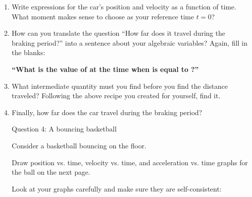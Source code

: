 \documentclass[12pt]{article}
\begin{document}
\begin{enumerate}
\item Write expressions for the car's position and velocity as a function of time. What moment makes sense to choose as your reference time $t=0$?

\vspace{1in}


\item How can you translate the question ``How far does it travel during the braking period?'' into a sentence about your algebraic variables? Again, fill in the blanks: 

\begin{center}
{\bf ``What is the value of \underline{\hspace{0.7in}} at the time when \underline{\hspace{0.7in}} is equal to \underline{\hspace{0.7in}}?''} 
\end{center}


\item What intermediate quantity must you find before you find the distance traveled? Following the above recipe you created for yourself, find it.




\vspace{2in}





\item Finally, how far does the car travel during the braking period?

\newpage

\centerline{\Large Question 4: A bouncing basketball}

Consider a basketball bouncing on the floor.

Draw position vs. time, velocity vs. time, and acceleration vs. time graphs for the ball on the next page.

Look at your graphs carefully and make sure they are self-consistent:



\end{enumerate}
\end{document}
